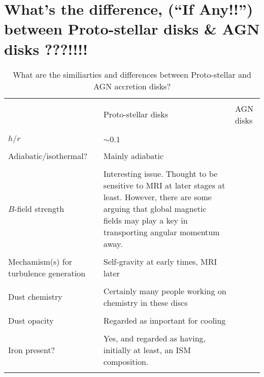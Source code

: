 \documentclass[11pt,a4paper]{article}
\begin{document}
\section{What's the difference, (``If Any!!'') between Proto-stellar disks \& AGN disks ???!!!!}
\begin{landscape}
\begin{table}[]
  \centering
  \caption{What are the similiarties and differences between 
    Proto-stellar and AGN accretion disks?
}
  \label{my-label}
  \begin{tabular}{  p{65mm}   p{70mm}  p{70mm} }
    \hline
    \hline
 &  &  \\
                              & Proto-stellar disks & AGN disks \\
 &  &  \\
        \hline
 &  &  \\
    $h/r$                              & $\sim0.1$    &   \\
 &  &  \\
    Adiabatic/isothermal?      &  Mainly adiabatic &  \\
 &  &  \\
    $B$-field strength             &  Interesting issue.  Thought to be sensitive to MRI at later stages at least.  
                                               However, there are some arguing that global magnetic fields may play a key in transporting angular momentum away.  &  \\
 &  &  \\
      Mechamism(s) for  turbulence generation           &  Self-gravity at early times,  MRI later &    \\
           &  &  \\
Dust chemistry                       &  Certainly many people working on chemistry in these discs
&  \\
 &  &  \\
Dust opacity                        &  Regarded as important for cooling&  \\
 &  &  \\
Iron present?                        & Yes, and regarded as having, initially at least, an ISM composition. &  \\
 &  &  \\
    \hline
    \hline
\end{tabular}
\end{table}
\end{landscape}
\end{document}
